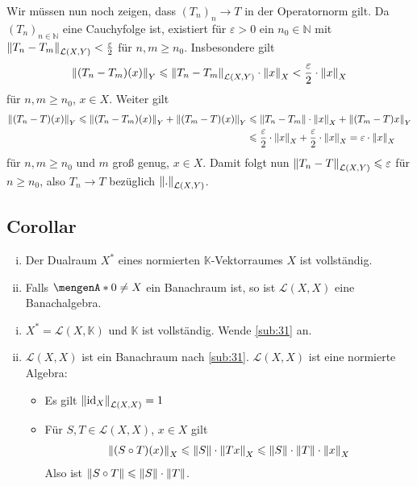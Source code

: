 Wir müssen nun noch zeigen, dass $(T_n)_n \to T$ in der Operatornorm gilt. Da $(T_n)_{n \in \mathds{N}}$ eine Cauchyfolge ist, existiert für $\varepsilon >0$ ein
$n_0 \in \mathds{N}$ mit $\norm[\mathcal{L}(X,Y)]{T_n - T_m}  < \frac{\varepsilon}{2} $ für $n,m \ge n_0$. Insbesondere gilt
\begin{align*}
	\norm[Y]{(T_n- T_m)(x)} \le \norm[\mathcal{L}(X,Y)]{T_n -T_m} \cdot \norm[X]{x} < \frac{\varepsilon}{2}  \cdot \norm[X]{x}    
\end{align*}
für $n,m \ge n_0$, $x \in X$. Weiter gilt 
\begin{align*}
	\norm[Y]{(T_n- T)(x)} \le \norm[Y]{(T_n - T_m)(x)} + \norm[Y]{(T_m-T)(x)} &\le \norm{T_n - T_m} \cdot \norm[X]{x} + \norm[Y]{(T_m-T)x} \\
	&\le \frac{\varepsilon}{2}  \cdot \norm[X]{x} + \frac{\varepsilon}{2}  \cdot \norm[X]{x}  = \varepsilon \cdot \norm[X]{x} 
\end{align*}
für $n,m \ge n_0$ und $m$ groß genug, $x \in X$. Damit folgt nun
$\norm[\mathcal{L}(X,Y)]{T_n -T} \le \varepsilon$ für $n \ge n_0$, also $T_n \to T$ bezüglich $\norm[\mathcal{L}(X,Y)]{.}$. \bewende

\subsection[Corollar: Dualraum vollständig und $\mathcal{L}(X,X)$ ist Banachalgebra, falls $X$ Banachraum]{Corollar} %
\label{sub:32}
\begin{enumerate}[(i)]
	\item Der Dualraum $X^*$ eines normierten $\mathds{K}$-Vektorraumes $X$ ist vollständig. 
	\item Falls $\set{0} \not= X$ ein Banachraum ist, so ist $\mathcal{L}(X,X)$ eine Banachalgebra.
\end{enumerate}
\begin{enumerate}[(i)]
	\item $X^*=\mathcal{L}(X,\mathds{K})$ und $\mathds{K}$ ist vollständig. Wende \ref{sub:31} an.
	\item $\mathcal{L}(X,X)$ ist ein Banachraum nach \ref{sub:31}. $\mathcal{L}(X,X)$ ist eine normierte Algebra: 
	\begin{itemize}
		\item Es gilt $\norm[\mathcal{L}(X,X)]{\id_X}=1$
		\item Für $S,T \in \mathcal{L}(X,X)$, $x \in X$ gilt
		\begin{align*}
			\norm[X]{(S \circ T)(x)} \le \norm{S} \cdot \norm[X]{T x} \le \norm{S} \cdot \norm{T} \cdot \norm[X]{x}   
		\end{align*}
		Also ist $\norm{S \circ T} \le \norm{S} \cdot \norm{T}$. \bewende
	\end{itemize}
\end{enumerate}

